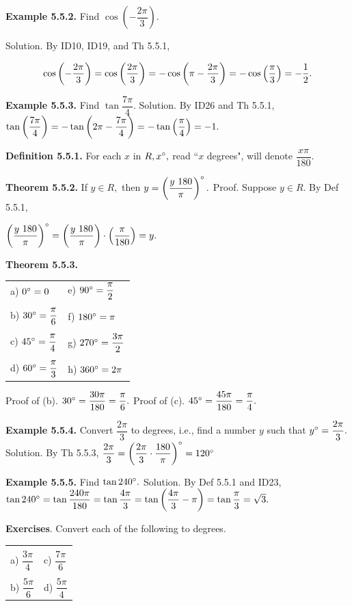 \textbf{Example 5.5.2.} Find $\cos\left(-\dfrac{2\pi}{3}\right).$\nl

Solution.  By ID10, ID19, and Th 5.5.1,\nl


\[
\cos \left( - \dfrac{2\pi}{3}\right) = \cos \left(\dfrac{2\pi}{3} \right) = -\cos \left(\pi - \dfrac{2\pi}{3}    \right)  = -\cos \left(\dfrac{\pi}{3}\right) = -\dfrac{1}{2}.
\]

\newpage
\textbf{Example 5.5.3.} Find $\tan \dfrac{7\pi}{4}.$\nl
Solution. By ID26 and Th 5.5.1,\nl
$\tan \left(\dfrac{7\pi}{4}\right) = -\tan \left(2\pi -\dfrac{7\pi}{4}\right) = - \tan \left(\dfrac{\pi}{4}\right) = -1.$\nl

\textbf{Definition 5.5.1.} For each $x$ in $R, x^{\circ},$ read ``$x$ degrees", will denote $\dfrac{x\pi}{180}.$\nl

\textbf{Theorem 5.5.2.} If $y\in R,$ then $y = \left(\dfrac{y~180}{\pi}\right)^{\circ}. $\nl
Proof. Suppose $y\in R.$ By Def 5.5.1,\nl

$\left(\dfrac{y~180}{\pi}\right)^{\circ}   =  \left(\dfrac{y~180}{\pi} \right)\cdot \left(\dfrac{\pi}{180} \right) = y.$\nl

 \textbf{Theorem 5.5.3.} \nl

\begin{tabular}{l l}
a) $0^{\circ} = 0$& e) $90^{\circ} = \dfrac{\pi}{2}$\\
&\\
b) $30^{\circ} = \dfrac{\pi}{6}$& f) $180^{\circ} = \pi$\\
&\\
c) $45^{\circ} = \dfrac{\pi}{4}$& g) $270^{\circ} = \dfrac{3\pi}{2}$\\
&\\
d) $60^{\circ} = \dfrac{\pi}{3}$& h) $360^{\circ} = 2\pi$\\
\end{tabular}\nl



Proof of (b). $30^{\circ} = \dfrac{30\pi}{180} = \dfrac{\pi}{6}.$\nl
Proof of (c). $45^{\circ} = \dfrac{45\pi}{180} = \dfrac{\pi}{4}.$\nl

\textbf{Example 5.5.4.} Convert $\dfrac{2\pi}{3}$ to degrees, i.e., find a number $y$ such that $y^{\circ} = \dfrac{2\pi}{3}.$\nl
Solution. By Th 5.5.3, $\dfrac{2\pi}{3} = \left( \dfrac{2\pi}{3}\cdot\dfrac{180}{\pi}\right)^{\circ} = 120^{\circ} $\nl

\textbf{Example 5.5.5.} Find $\tan 240^{\circ} .$\nl
Solution. By Def 5.5.1 and ID23, $\tan 240^{\circ} = \tan \dfrac{240\pi}{180} =\tan \dfrac{4\pi}{3} = \tan\left( \dfrac{4\pi}{3} - \pi\right) = \tan \dfrac{\pi}{3} = \sqrt{3}.$\nl

\textbf{Exercises}. 	Convert each of the following to degrees.\nl
\begin{tabular}{l l}
&\\
a) $\dfrac{3\pi}{4}$  &  c) $\dfrac{7\pi}{6}$\\
&\\
b) $\dfrac{5\pi}{6}$   &  d) $\dfrac{5\pi}{4}$\\
\end{tabular}

